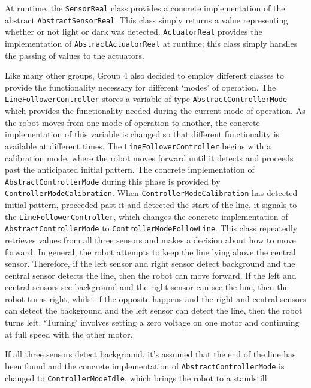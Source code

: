 At runtime, the \texttt{SensorReal} class provides a concrete
implementation of the abstract \texttt{Ab\-stract\-Sensor\-Real}.  This
class simply returns a value representing whether or not light or dark
was detected.  \texttt{Actuator\-Real} provides the implementation of
\texttt{AbstractActuatorReal} at runtime; this class simply handles
the passing of values to the actuators.

Like many other groups, Group 4 also decided to employ different
classes to provide the functionality necessary for different `modes'
of operation.  The \texttt{LineFollower\-Controller} stores a variable
of type \texttt{AbstractControllerMode} which provides the
functionality needed during the current mode of operation.  As the
robot moves from one mode of operation to another, the concrete
implementation of this variable is changed so that different
functionality is available at different times.  The
\texttt{LineFollowerController} begins with a calibration mode, where
the robot moves forward until it detects and proceeds past the
anticipated initial pattern.  The concrete implementation of
\texttt{AbstractControllerMode} during this phase is provided by
\texttt{ControllerModeCalibration}.  When
\texttt{ControllerModeCalibration} has detected initial pattern,
proceeded past it and detected the start of the line, it signals to
the \texttt{Line\-Follower\-Controller}, which changes the concrete
implementation of \texttt{AbstractControllerMode} to
\texttt{ControllerModeFollowLine}.  This class repeatedly retrieves
values from all three sensors and makes a decision about how to move
forward.  In general, the robot attempts to keep the line lying above
the central sensor.  Therefore, if the left sensor and right sensor
detect background and the central sensor detects the line, then the
robot can move forward.  If the left and central sensors see
background and the right sensor can see the line, then the robot turns
right, whilst if the opposite happens and the right and central
sensors can detect the background and the left sensor can detect the
line, then the robot turns left.  `Turning' involves setting a zero
voltage on one motor and continuing at full speed with the other
motor.

If all three sensors detect background, it's assumed that the end of the line has been found and the concrete implementation of \texttt{AbstractControllerMode} is changed to \texttt{Controller\-Mode\-Idle}, which brings the robot to a standstill.

